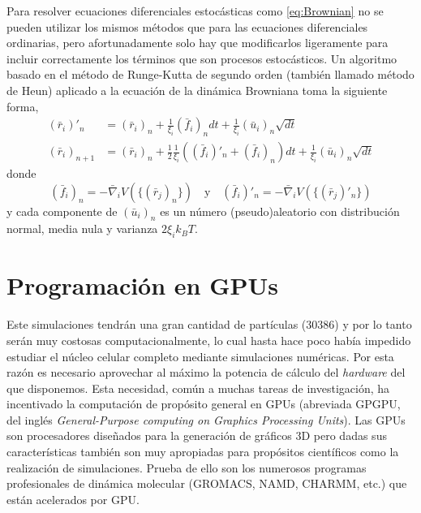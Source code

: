 Para resolver ecuaciones diferenciales estocásticas como \eqref{eq:Brownian} no se pueden utilizar los mismos métodos que para las ecuaciones diferenciales ordinarias, pero afortunadamente solo hay que modificarlos ligeramente para incluir correctamente los términos que son procesos estocásticos. Un algoritmo basado en el método de Runge-Kutta de segundo orden (también llamado método de Heun) \cite{Toral2014} aplicado a la ecuación de la dinámica Browniana toma la siguiente forma,
\begin{equation}
    \label{eq:RK_method}
    \begin{aligned}
        (\bar{r}_i)'_{n}  & = (\bar{r}_i)_n+\frac{1}{\xi_i}(\bar{f}_i)_ndt+\frac{1}{\xi_i}(\bar{u}_i)_n\sqrt{dt}                                        \\
        (\bar{r}_i)_{n+1} & = (\bar{r}_i)_n+\frac{1}{2}\frac{1}{\xi_i}\left((\bar{f}_i)'_n+(\bar{f}_i)_n\right)dt+\frac{1}{\xi_i}(\bar{u}_i)_n\sqrt{dt}
    \end{aligned}
\end{equation}
donde
\begin{equation}
    \label{eq:RK_method_forces}
    (\bar{f}_i)_n=-\bar{\nabla}_iV(\{(\bar{r}_j)_n\}) \quad \text{y} \quad (\bar{f}_i)'_n=-\bar{\nabla}_iV(\{(\bar{r}_j)'_n\})
\end{equation}
y cada componente de $(\bar{u}_i)_n$ es un número (pseudo)aleatorio con distribución normal, media nula y varianza $2\xi_ik_BT$.

\section{Programación en GPUs}

Este simulaciones tendrán una gran cantidad de partículas ($30386$) y por lo tanto serán muy costosas computacionalmente, lo cual hasta hace poco había impedido estudiar el núcleo celular completo mediante simulaciones numéricas. Por esta razón es necesario aprovechar al máximo la potencia de cálculo del \textit{hardware} del que disponemos. Esta necesidad, común a muchas tareas de investigación, ha incentivado la computación de propósito general en GPUs (abreviada GPGPU, del inglés \textit{General-Purpose computing on Graphics Processing Units}). Las GPUs son procesadores diseñados para la generación de gráficos 3D pero dadas sus características también son muy apropiadas para propósitos científicos como la realización de simulaciones. Prueba de ello son los numerosos programas profesionales de dinámica molecular (GROMACS, NAMD, CHARMM, etc.) que están acelerados por GPU.

